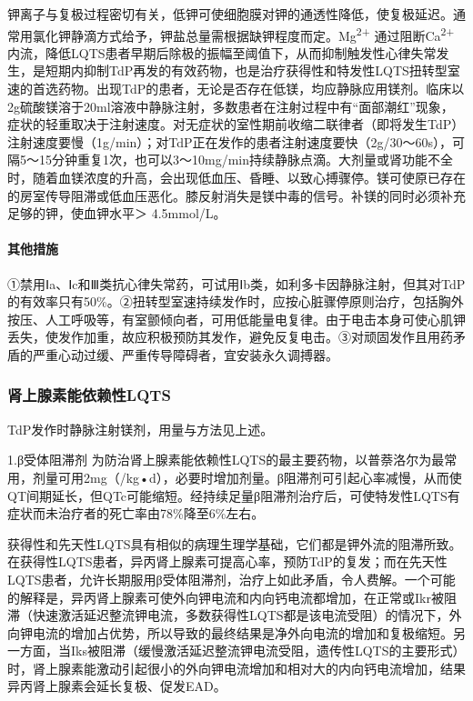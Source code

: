 钾离子与复极过程密切有关，低钾可使细胞膜对钾的通透性降低，使复极延迟。通常用氯化钾静滴方式给予，钾盐总量需根据缺钾程度而定。Mg\textsuperscript{2+}
通过阻断Ca\textsuperscript{2+}
内流，降低LQTS患者早期后除极的振幅至阈值下，从而抑制触发性心律失常发生，是短期内抑制TdP再发的有效药物，也是治疗获得性和特发性LQTS扭转型室速的首选药物。出现TdP的患者，无论是否存在低镁，均应静脉应用镁剂。临床以2g硫酸镁溶于20ml溶液中静脉注射，多数患者在注射过程中有“面部潮红”现象，症状的轻重取决于注射速度。对无症状的室性期前收缩二联律者（即将发生TdP）注射速度要慢（1g/min）；对TdP正在发作的患者注射速度要快（2g/30～60s），可隔5～15分钟重复1次，也可以3～10mg/min持续静脉点滴。大剂量或肾功能不全时，随着血镁浓度的升高，会出现低血压、昏睡、以致心搏骤停。镁可使原已存在的房室传导阻滞或低血压恶化。膝反射消失是镁中毒的信号。补镁的同时必须补充足够的钾，使血钾水平＞
4.5mmol/L。

\paragraph{其他措施}

①禁用Ⅰa、Ⅰc和Ⅲ类抗心律失常药，可试用Ⅰb类，如利多卡因静脉注射，但其对TdP的有效率只有50\%。②扭转型室速持续发作时，应按心脏骤停原则治疗，包括胸外按压、人工呼吸等，有室颤倾向者，可用低能量电复律。由于电击本身可使心肌钾丢失，使发作加重，故应积极预防其发作，避免反复电击。③对顽固发作且用药矛盾的严重心动过缓、严重传导障碍者，宜安装永久调搏器。

\subsubsection{肾上腺素能依赖性LQTS}

TdP发作时静脉注射镁剂，用量与方法见上述。

1.β受体阻滞剂
为防治肾上腺素能依赖性LQTS的最主要药物，以普萘洛尔为最常用，剂量可用2mg（/kg•d），必要时增加剂量。β阻滞剂可引起心率减慢，从而使QT间期延长，但QTc可能缩短。经持续足量β阻滞剂治疗后，可使特发性LQTS有症状而未治疗者的死亡率由78\%降至6\%左右。

获得性和先天性LQTS具有相似的病理生理学基础，它们都是钾外流的阻滞所致。在获得性LQTS患者，异丙肾上腺素可提高心率，预防TdP的复发；而在先天性LQTS患者，允许长期服用β受体阻滞剂，治疗上如此矛盾，令人费解。一个可能的解释是，异丙肾上腺素可使外向钾电流和内向钙电流都增加，在正常或Ikr被阻滞（快速激活延迟整流钾电流，多数获得性LQTS都是该电流受阻）的情况下，外向钾电流的增加占优势，所以导致的最终结果是净外向电流的增加和复极缩短。另一方面，当Iks被阻滞（缓慢激活延迟整流钾电流受阻，遗传性LQTS的主要形式）时，肾上腺素能激动引起很小的外向钾电流增加和相对大的内向钙电流增加，结果异丙肾上腺素会延长复极、促发EAD。

